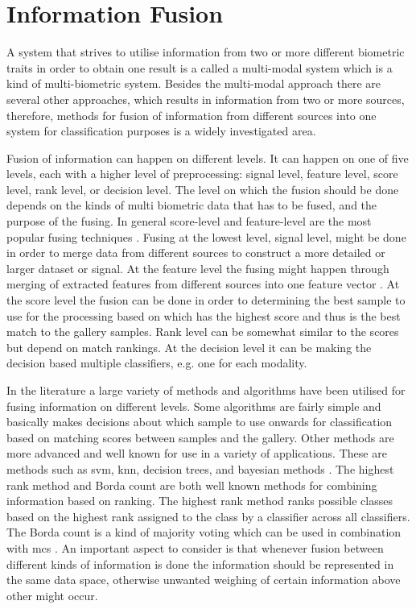 \section{Information Fusion}

A system that strives to utilise information from two or more different biometric traits in order to obtain one result is a called a multi-modal system which is a kind of multi-biometric system. Besides the multi-modal approach there are several other approaches, which results in information from two or more sources, therefore, methods for fusion of information from different sources into one system for classification purposes is a widely investigated area. \citep{Bowyer2016b} 

Fusion of information can happen on different levels. It can happen on one of five levels, each with a higher level of preprocessing: signal level, feature level, score level, rank level, or decision level. The level on which the fusion should be done depends on the kinds of multi biometric data that has to be fused, and the purpose of the fusing. In general score-level and feature-level are the most popular fusing techniques \citep{Bowyer2016b}. Fusing at the lowest level, signal level, might be done in order to merge data from different sources to construct a more detailed or larger dataset or signal. At the feature level the fusing might happen through merging of extracted features from different sources into one feature vector \citep{Ross2003}. At the score level the fusion can be done in order to determining the best sample to use for the processing based on which has the highest score and thus is the best match to the gallery samples. Rank level can be somewhat similar to the scores but depend on match rankings. At the decision level it can be making the decision based multiple classifiers, e.g. one for each modality\citep{Fierrez2018b}.

In the literature a large variety of methods and algorithms have been utilised for fusing information on different levels. Some algorithms are fairly simple and basically makes decisions about which sample to use onwards for classification based on matching scores between samples and the gallery. Other methods are more advanced and well known for use in a variety of applications. These are methods such as \gls{svm}, \gls{knn}, decision trees, and bayesian methods \citep{Ross2003}. The highest rank method and Borda count are both well known methods for combining information based on ranking. The highest rank method ranks possible classes based on the highest rank assigned to the class by a classifier across all classifiers.\citep{Ho1994} The Borda count is a kind of majority voting which can be used in combination with \gls{mcs} \citep{Bowyer2016b,Ho1994}. An important aspect to consider is that whenever fusion between different kinds of information is done the information should be represented in the same data space, otherwise unwanted weighing of certain information above other might occur.   

